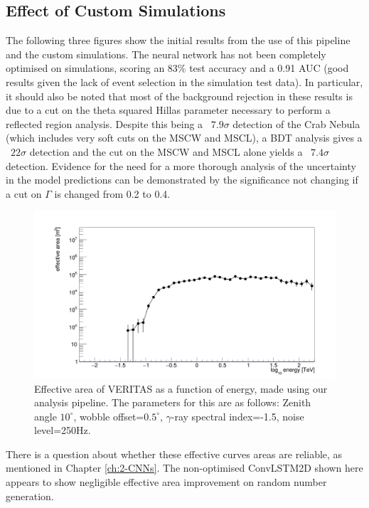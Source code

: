 \subsection{Effect of Custom Simulations}
The following three figures show the initial results from the use of this pipeline and the custom simulations. The neural network has not been completely optimised on simulations, scoring an 83\% test accuracy and a 0.91 AUC (good results given the lack of event selection in the simulation test data). In particular, it should also be noted that most of the background rejection in these results is due to a cut on the theta squared Hillas parameter necessary to perform a reflected region analysis. Despite this being a ~$7.9\sigma$ detection of the Crab Nebula (which includes very soft cuts on the MSCW and MSCL), a BDT analysis gives a ~$22\sigma$ detection and the cut on the MSCW and MSCL alone yields a ~$7.4\sigma$ detection. Evidence for the need for a more thorough analysis of the  uncertainty in the model predictions can be demonstrated by the significance not changing if a cut on $\Gamma$ is changed from 0.2 to 0.4.
\begin{figure}[] 
        \centering \includegraphics[width=\columnwidth]{figures/EFF.png}

        \caption{
                \label{fig:EFF} Effective area of VERITAS as a function of energy, made using our analysis pipeline. The parameters for this are as follows: Zenith angle $10^{\circ}$, wobble offset=$0.5^{\circ}$, $\gamma$-ray spectral index=-1.5, noise level=250Hz. 
        }
\end{figure}
There is a question about whether these effective curves areas are reliable, as mentioned in Chapter \ref{ch:2-CNNs}. The non-optimised ConvLSTM2D shown here appears to show negligible effective area improvement on random number generation.

